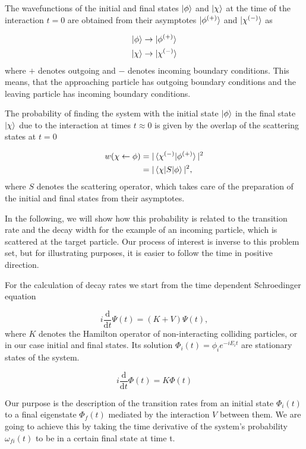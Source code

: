 The wavefunctions of the initial and final states $\ket{\phi}$
and $\ket{\chi}$
at the time of the interaction
$t=0$ are obtained from their asymptotes $\ket{\phi ^{(+)}}$ 
and $\ket{\chi ^{(-)}}$ as

\begin{align}
  \ket{\phi}  &\rightarrow  \ket{\phi ^{(+)}}\\
  \ket{\chi}  &\rightarrow  \ket{\chi ^{(-)}}
\end{align}
where $+$ denotes outgoing and $-$ denotes incoming boundary conditions.
This means, that the approaching particle has outgoing boundary conditions and the
leaving particle has incoming boundary conditions.

The probability of finding the system with the initial state $\ket{\phi}$ in
the final state $\ket{\chi}$ due to the interaction at times $t\approx 0$ is given
by the overlap of the scattering states at $t=0$

\begin{align}
  w(\chi \leftarrow \phi) &= | \braket{\chi^{(-)}|\phi^{(+)}} |^2   \\
                          &= | \braket{\chi|S|\phi} | ^2    ,
\end{align}
where $S$ denotes the scattering operator, which takes care of the preparation
of the initial and final states from their asymptotes.

In the following, we will show how this probability is related to the transition
rate and the decay width for the example of an incoming particle, which is scattered
at the target particle. Our process of interest is inverse to this problem set, but
for illustrating purposes, it is easier to follow the time in positive direction.

For the calculation of decay rates we start
from the time dependent Schroedinger equation

\begin{equation}
  i \frac{\mathrm{d}}{\mathrm{d}t} \Psi(t) = (K + V) \Psi(t) ,
\end{equation}
where $K$ denotes the Hamilton operator of non-interacting colliding
particles, or in our case initial and final states. Its solution
$\Phi_i(t) = \phi_i e^{-iE_it}$ are stationary states of the system.

\begin{equation}
  i \frac{\mathrm{d}}{\mathrm{d}t} \Phi(t) = K \Phi(t)
\end{equation}

Our purpose is the description of the transition rates from an initial state
$\Phi_i(t)$ to a final eigenstate $\Phi_f(t)$ mediated by the interaction $V$ between
them. We are going to achieve this by taking the time derivative of the system's
probability $\omega_{fi}(t)$ to be in a certain final state at time t.

